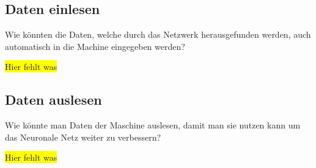 \subsection{Daten einlesen}
Wie könnten die Daten, welche durch das Netzwerk herausgefunden werden, auch automatisch in die Machine eingegeben werden?

\colorbox{yellow}{Hier fehlt was}

\subsection{Daten auslesen}
Wie könnte man Daten der Maschine auslesen, damit man sie nutzen kann um das Neuronale Netz weiter zu verbessern?

\colorbox{yellow}{Hier fehlt was}